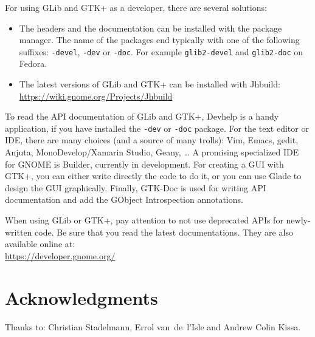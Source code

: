For using GLib and GTK+ as a developer, there are several solutions:
\begin{itemize}
  \item The headers and the documentation can be installed with the package manager. The name of the packages end typically with one of the following suffixes: \texttt{-devel}, \texttt{-dev} or \texttt{-doc}. For example \texttt{glib2-devel} and \texttt{glib2-doc} on Fedora.
  \item The latest versions of GLib and GTK+ can be installed with Jhbuild:\\
  \url{https://wiki.gnome.org/Projects/Jhbuild}
\end{itemize}

To read the API documentation of GLib and GTK+, Devhelp is a handy application, if you have installed the \texttt{-dev} or \texttt{-doc} package. For the text editor or IDE, there are many choices (and a source of many trolls): Vim, Emacs, gedit, Anjuta, MonoDevelop/Xamarin Studio, Geany, … A promising specialized IDE for GNOME is Builder, currently in development. For creating a GUI with GTK+, you can either write directly the code to do it, or you can use Glade to design the GUI graphically. Finally, GTK-Doc is used for writing API documentation and add the GObject Introspection annotations.

When using GLib or GTK+, pay attention to not use deprecated APIs for newly-written code. Be sure that you read the latest documentations. They are also available online at:\\
\url{https://developer.gnome.org/}

\section{Acknowledgments}

Thanks to: Christian Stadelmann, Errol van~de~l'Isle and Andrew Colin Kissa.
